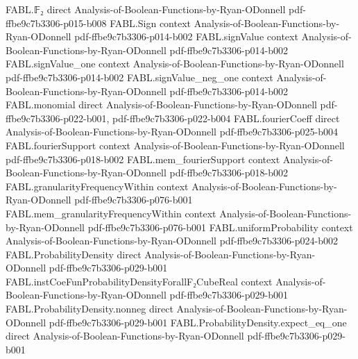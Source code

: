 \begin{theorem}
\label{FABL.ProbabilityDensity.expectation_convolution}
\leanok
{}
\proofstep
  {FABL.𝔽₂}
  {direct}
  {Analysis-of-Boolean-Functions-by-Ryan-ODonnell}
  {pdf-ffbe9c7b3306-p015-b008}
\proofstep
  {FABL.Sign}
  {context}
  {Analysis-of-Boolean-Functions-by-Ryan-ODonnell}
  {pdf-ffbe9c7b3306-p014-b002}
\proofstep
  {FABL.signValue}
  {context}
  {Analysis-of-Boolean-Functions-by-Ryan-ODonnell}
  {pdf-ffbe9c7b3306-p014-b002}
\proofstep
  {FABL.signValue_one}
  {context}
  {Analysis-of-Boolean-Functions-by-Ryan-ODonnell}
  {pdf-ffbe9c7b3306-p014-b002}
\proofstep
  {FABL.signValue_neg_one}
  {context}
  {Analysis-of-Boolean-Functions-by-Ryan-ODonnell}
  {pdf-ffbe9c7b3306-p014-b002}
\proofstep
  {FABL.monomial}
  {direct}
  {Analysis-of-Boolean-Functions-by-Ryan-ODonnell}
  {pdf-ffbe9c7b3306-p022-b001,
    pdf-ffbe9c7b3306-p022-b004}
\proofstep
  {FABL.fourierCoeff}
  {direct}
  {Analysis-of-Boolean-Functions-by-Ryan-ODonnell}
  {pdf-ffbe9c7b3306-p025-b004}
\proofstep
  {FABL.fourierSupport}
  {context}
  {Analysis-of-Boolean-Functions-by-Ryan-ODonnell}
  {pdf-ffbe9c7b3306-p018-b002}
\proofstep
  {FABL.mem_fourierSupport}
  {context}
  {Analysis-of-Boolean-Functions-by-Ryan-ODonnell}
  {pdf-ffbe9c7b3306-p018-b002}
\proofstep
  {FABL.granularityFrequencyWithin}
  {context}
  {Analysis-of-Boolean-Functions-by-Ryan-ODonnell}
  {pdf-ffbe9c7b3306-p076-b001}
\proofstep
  {FABL.mem_granularityFrequencyWithin}
  {context}
  {Analysis-of-Boolean-Functions-by-Ryan-ODonnell}
  {pdf-ffbe9c7b3306-p076-b001}
\proofstep
  {FABL.uniformProbability}
  {context}
  {Analysis-of-Boolean-Functions-by-Ryan-ODonnell}
  {pdf-ffbe9c7b3306-p024-b002}
\proofstep
  {FABL.ProbabilityDensity}
  {direct}
  {Analysis-of-Boolean-Functions-by-Ryan-ODonnell}
  {pdf-ffbe9c7b3306-p029-b001}
\proofstep
  {FABL.instCoeFunProbabilityDensityForallF₂CubeReal}
  {context}
  {Analysis-of-Boolean-Functions-by-Ryan-ODonnell}
  {pdf-ffbe9c7b3306-p029-b001}
\proofstep
  {FABL.ProbabilityDensity.nonneg}
  {direct}
  {Analysis-of-Boolean-Functions-by-Ryan-ODonnell}
  {pdf-ffbe9c7b3306-p029-b001}
\proofstep
  {FABL.ProbabilityDensity.expect_eq_one}
  {direct}
  {Analysis-of-Boolean-Functions-by-Ryan-ODonnell}
  {pdf-ffbe9c7b3306-p029-b001}
\proofstep

\end{theorem}
